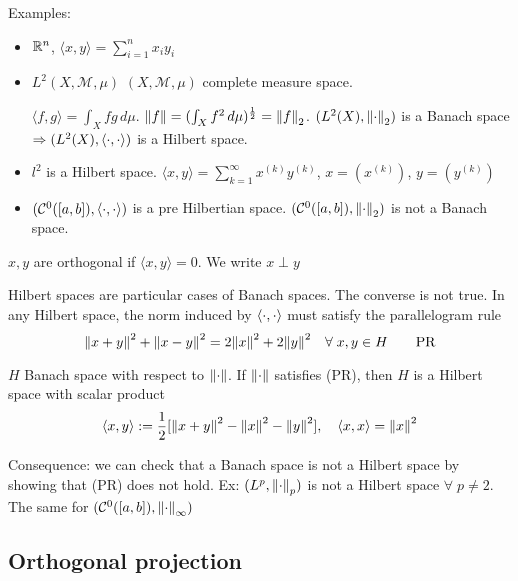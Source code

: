 Examples:
\begin{itemize}
    \item \(\mathbb{R}^n\), \(\langle x, y\rangle = \sum_{i=1}^n x_i y_i\)
    \item \(L^2(X, \mathcal{M}, \mu)\) \((X, \mathcal{M}, \mu)\) complete measure space. 
    
    \(\langle f, g\rangle = \int_X fg \, d\mu\). \(\norm{f} = (\int_X f^2 \, d\mu)^\frac{1}{2} = \norm{f}_2\). \((L^2(X), \norm{\cdot}_2)\) is a Banach space \(\Rightarrow (L^2(X), \langle \cdot,\cdot \rangle)\) is a Hilbert space.
    \item \(l^2\) is a Hilbert space. \(\langle x, y\rangle = \sum_{k=1}^\infty x^{(k)} y^{(k)}\), \(x = (x^{(k)})\), \(y = (y^{(k)})\)
    \item \((\mathcal{C}^0([a, b]), \langle \cdot,\cdot \rangle )\) is a pre Hilbertian space. \((\mathcal{C}^0([a, b]), \norm{\cdot}_2 )\) is not a Banach space. 
\end{itemize}

\begin{definition}
    \(x, y\) are orthogonal if \(\langle x, y \rangle=0\). We write \(x \perp y\)
\end{definition}
\begin{remark}
    Hilbert spaces are particular cases of Banach spaces. The converse is not true. In any Hilbert space, the norm induced by \(\langle \cdot,\cdot \rangle\) must satisfy the parallelogram rule
    \[
        \norm{x+y}^2 + \norm{x-y}^2 = 2\norm{x}^2 + 2\norm{y}^2 \quad \forall \; x, y \in H \tag*{PR}
    \]
\end{remark}

\begin{proposition}
    \(H\) Banach space with respect to \(\norm{\cdot}\). If \(\norm{\cdot}\) satisfies (PR), then \(H\) is a Hilbert space with scalar product 
    \[
        \langle x, y \rangle := \frac{1}{2} [\norm{x+y}^2 - \norm{x}^2 - \norm{y}^2], \quad \langle x,x \rangle = \norm{x}^2
    \]
\end{proposition}

Consequence: we can check that a Banach space is not a Hilbert space by showing that (PR) does not hold.
Ex: \((L^p, \norm{\cdot}_p)\) is not a Hilbert space \(\forall\; p \neq 2\). The same for \((\mathcal{C}^0([a, b]), \norm{\cdot}_\infty )\)

\subsection*{Orthogonal projection}


